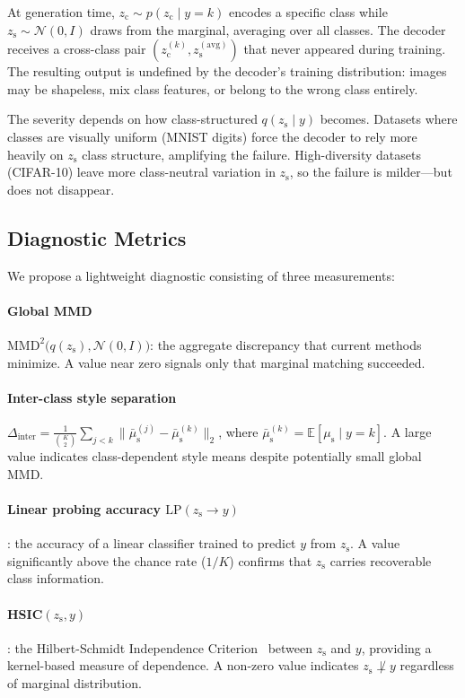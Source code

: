 \documentclass[10pt]{article}
\newcommand{\zc}{z_{\mathrm{c}}}
\newcommand{\zs}{z_{\mathrm{s}}}
\newcommand{\mus}{\mu_{\mathrm{s}}}
\newcommand{\MMD}{\mathrm{MMD}}
\begin{document}
At generation time, $\zc\sim p(\zc\mid y{=}k)$ encodes a specific class while
$\zs\sim\mathcal{N}(0,I)$ draws from the marginal, averaging over all classes.
The decoder receives a cross-class pair $(\zc^{(k)}, \zs^{(\mathrm{avg})})$ that
never appeared during training.
The resulting output is undefined by the decoder's training distribution:
images may be shapeless, mix class features, or belong to the wrong class entirely.

The severity depends on how class-structured $q(\zs\mid y)$ becomes.
Datasets where classes are visually uniform (MNIST digits) force the decoder to
rely more heavily on $\zs$ class structure, amplifying the failure.
High-diversity datasets (CIFAR-10) leave more class-neutral variation in $\zs$,
so the failure is milder---but does not disappear.

\subsection{Diagnostic Metrics}
\label{sec:diagnostics}

We propose a lightweight diagnostic consisting of three measurements:

\paragraph{Global MMD} $\MMD^2\bigl(q(\zs),\mathcal{N}(0,I)\bigr)$:
the aggregate discrepancy that current methods minimize.
A value near zero signals only that marginal matching succeeded.

\paragraph{Inter-class style separation}
$\Delta_{\mathrm{inter}} = \frac{1}{\binom{K}{2}}\sum_{j<k}\|\bar\mus^{(j)}-\bar\mus^{(k)}\|_2$,
where $\bar\mus^{(k)}=\mathbb{E}[\mus\mid y{=}k]$.
A large value indicates class-dependent style means despite potentially small global MMD.

\paragraph{Linear probing accuracy $\mathrm{LP}(\zs\to y)$}:
the accuracy of a linear classifier trained to predict $y$ from $\zs$.
A value significantly above the chance rate ($1/K$) confirms that $\zs$ carries
recoverable class information.

\paragraph{HSIC$(\zs, y)$}:
the Hilbert-Schmidt Independence Criterion~\citep{gretton2005measuring}
between $\zs$ and $y$, providing a kernel-based measure of dependence.
A non-zero value indicates $\zs\not\perp y$ regardless of marginal distribution.
\end{document}

